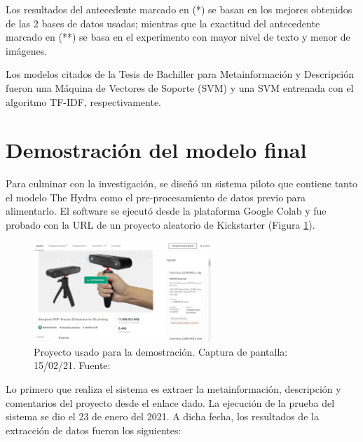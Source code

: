 Los resultados del antecedente marcado en (*) se basan en los mejores obtenidos de las 2 bases de datos usadas; mientras que la exactitud del antecedente marcado en (**) se basa en el experimento con mayor nivel de texto y menor de imágenes.

Los modelos citados de la Tesis de Bachiller para Metainformación y Descripción fueron una Máquina de Vectores de Soporte (SVM) y una SVM entrenada con el algoritmo TF-IDF, respectivamente.

\section{Demostración del modelo final}
Para culminar con la investigación, se diseñó un sistema piloto que contiene tanto el modelo The Hydra como el pre-procesamiento de datos previo para alimentarlo. El software se ejecutó desde la plataforma Google Colab y fue probado con la URL de un proyecto aleatorio de Kickstarter (Figura \ref{5:fig13}).

\begin{figure}[!ht]
	\begin{center}
		\includegraphics[width=0.60\textwidth]{5/figures/example_project_150221.jpg}
		\caption{Proyecto usado para la demostración. Captura de pantalla: 15/02/21. Fuente: \cite{ot_kickstarter_revopointproject}}
		\label{5:fig13}
	\end{center}
\end{figure}

Lo primero que realiza el sistema es extraer la metainformación, descripción y comentarios del proyecto desde el enlace dado. La ejecución de la prueba del sistema se dio el 23 de enero del 2021. A dicha fecha, los resultados de la extracción de datos fueron los siguientes: